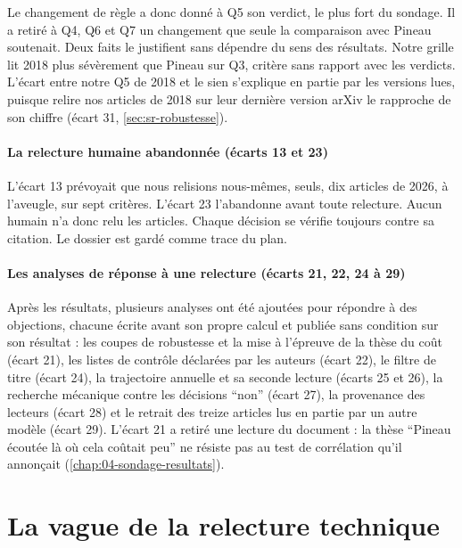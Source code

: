 Le changement de règle a donc donné à Q5 son verdict, le plus fort du sondage. Il a retiré à Q4, Q6 et Q7 un changement que seule la comparaison avec Pineau soutenait. Deux faits le justifient sans
dépendre du sens des résultats. Notre grille lit 2018 plus sévèrement que Pineau sur Q3, critère
sans rapport avec les verdicts. L'écart entre notre Q5 de 2018 et le sien s'explique en partie par
les versions lues, puisque relire nos articles de 2018 sur leur dernière version arXiv le rapproche
de son chiffre (écart 31, \cref{sec:sr-robustesse}).

\paragraph{La relecture humaine abandonnée (écarts 13 et 23)} L'écart 13 prévoyait que nous
relisions nous-mêmes, seuls, dix articles de 2026, à l'aveugle, sur sept critères. L'écart 23 l'abandonne
avant toute relecture. Aucun humain n'a donc relu les articles. Chaque décision
se vérifie toujours contre sa citation. Le dossier  est gardé comme trace
du plan.

\paragraph{Les analyses de réponse à une relecture (écarts 21, 22, 24 à 29)} Après les résultats,
plusieurs analyses ont été ajoutées pour répondre à des objections, chacune écrite avant son propre
calcul et publiée sans condition sur son résultat : les coupes de robustesse et la mise à l'épreuve de la thèse
du coût (écart 21), les listes de contrôle déclarées par les auteurs (écart 22), le filtre de titre
(écart 24), la trajectoire annuelle et sa seconde lecture (écarts 25 et 26), la recherche mécanique
contre les décisions \enquote{non} (écart 27), la provenance des lecteurs (écart 28) et le retrait des
treize articles lus en partie par un autre modèle (écart 29). L'écart 21 a retiré une lecture du
document : la thèse \enquote{Pineau écoutée là où cela coûtait peu} ne résiste pas au test de
corrélation qu'il annonçait (\cref{chap:04-sondage-resultats}).

\section{La vague de la relecture technique}
\label{sec:ecarts-audit}


